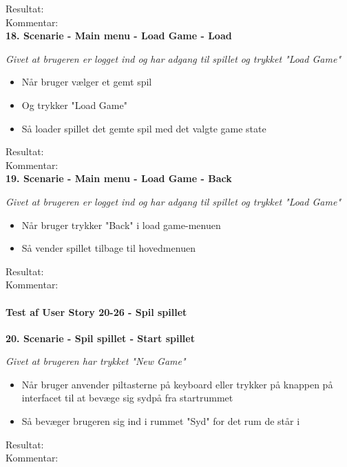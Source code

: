 Resultat:\\
Kommentar:\\

\textbf{18. Scenarie - Main menu - Load Game - Load}

\textit{Givet at brugeren er logget ind og har adgang til spillet og trykket "Load Game"}

\begin{itemize}
  \item Når bruger vælger et gemt spil
  \item Og trykker "Load Game"
  \item Så loader spillet det gemte spil med det valgte game state
\end{itemize}

Resultat:\\
Kommentar:\\

\textbf{19. Scenarie - Main menu - Load Game - Back}

\textit{Givet at brugeren er logget ind og har adgang til spillet og trykket "Load Game"}

\begin{itemize}
  \item Når bruger trykker "Back" i load game-menuen
  \item Så vender spillet tilbage til hovedmenuen
\end{itemize}

Resultat:\\
Kommentar:\\

\paragraph{Test af User Story 20-26 - Spil spillet}

\textbf{20. Scenarie - Spil spillet - Start spillet}

\textit{Givet at brugeren har trykket "New Game"}

\begin{itemize}
  \item Når bruger anvender piltasterne på keyboard eller trykker på knappen på interfacet til at bevæge sig sydpå fra startrummet
  \item Så bevæger brugeren sig ind i rummet "Syd" for det rum de står i
\end{itemize}

Resultat:\\
Kommentar:\\

